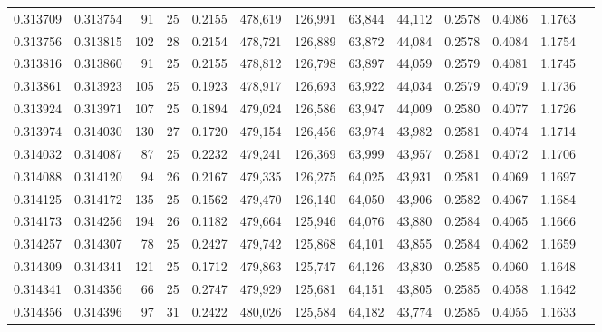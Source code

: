 \begin{tabular}{rrrrrrrrrrrrr}
0.313709 & 0.313754 &    91 &  25 &                                     0.2155 & 478,619 & 126,991 &  63,844 &  44,112 & 0.2578 & 0.4086 & 1.1763 \\
0.313756 & 0.313815 &   102 &  28 &                                     0.2154 & 478,721 & 126,889 &  63,872 &  44,084 & 0.2578 & 0.4084 & 1.1754 \\
0.313816 & 0.313860 &    91 &  25 &                                     0.2155 & 478,812 & 126,798 &  63,897 &  44,059 & 0.2579 & 0.4081 & 1.1745 \\
0.313861 & 0.313923 &   105 &  25 &                                     0.1923 & 478,917 & 126,693 &  63,922 &  44,034 & 0.2579 & 0.4079 & 1.1736 \\
0.313924 & 0.313971 &   107 &  25 &                                     0.1894 & 479,024 & 126,586 &  63,947 &  44,009 & 0.2580 & 0.4077 & 1.1726 \\
0.313974 & 0.314030 &   130 &  27 &                                     0.1720 & 479,154 & 126,456 &  63,974 &  43,982 & 0.2581 & 0.4074 & 1.1714 \\
0.314032 & 0.314087 &    87 &  25 &                                     0.2232 & 479,241 & 126,369 &  63,999 &  43,957 & 0.2581 & 0.4072 & 1.1706 \\
0.314088 & 0.314120 &    94 &  26 &                                     0.2167 & 479,335 & 126,275 &  64,025 &  43,931 & 0.2581 & 0.4069 & 1.1697 \\
0.314125 & 0.314172 &   135 &  25 &                                     0.1562 & 479,470 & 126,140 &  64,050 &  43,906 & 0.2582 & 0.4067 & 1.1684 \\
0.314173 & 0.314256 &   194 &  26 &                                     0.1182 & 479,664 & 125,946 &  64,076 &  43,880 & 0.2584 & 0.4065 & 1.1666 \\
0.314257 & 0.314307 &    78 &  25 &                                     0.2427 & 479,742 & 125,868 &  64,101 &  43,855 & 0.2584 & 0.4062 & 1.1659 \\
0.314309 & 0.314341 &   121 &  25 &                                     0.1712 & 479,863 & 125,747 &  64,126 &  43,830 & 0.2585 & 0.4060 & 1.1648 \\
0.314341 & 0.314356 &    66 &  25 &                                     0.2747 & 479,929 & 125,681 &  64,151 &  43,805 & 0.2585 & 0.4058 & 1.1642 \\
0.314356 & 0.314396 &    97 &  31 &                                     0.2422 & 480,026 & 125,584 &  64,182 &  43,774 & 0.2585 & 0.4055 & 1.1633 \\

\end{tabular}
